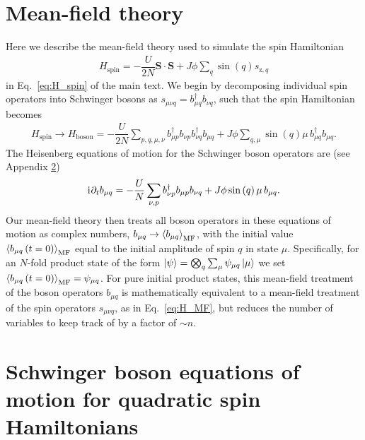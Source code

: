 \documentclass[nofootinbib,twocolumn]{revtex4-2}
\renewcommand{\t}{\text} %
\newcommand{\f}[2]{\dfrac{#1}{#2}} %
\newcommand{\p}[1]{\left(#1\right)} %
\newcommand{\bk}{\Braket} %
\renewcommand{\v}{\bm} %
\renewcommand{\c}{\cdot} %
\renewcommand{\i}{\mathrm{i}\mkern1mu} %
\newcommand{\1}{\mathds{1}}
\newcommand{\z}{\text{z}}
\newcommand{\spin}{\text{spin}}
\newcommand{\MF}{\text{MF}}
\begin{document}
\section{Mean-field theory}
\label{sec:MFT}

Here we describe the mean-field theory used to simulate the spin Hamiltonian
\begin{align}
  H_\spin = -\f{U}{2N}\v S\c\v S + J\phi \sum_q \sin\p{q} s_{\z,q}
\end{align}
in Eq.~\eqref{eq:H_spin} of the main text.
We begin by decomposing individual spin operators into Schwinger bosons as $s_{\mu\nu q} = b_{\mu q}^\dag b_{\nu q}$, such that the spin Hamiltonian becomes
\begin{align}
  H_\spin \to H_{\t{boson}}
  = -\f{U}{2N} \sum_{p,q,\mu,\nu}
  b_{\mu p}^\dag b_{\nu p} b_{\nu q}^\dag b_{\mu q}
  + J\phi \sum_{q,\mu} \sin\p{q} \mu\, b_{\mu q}^\dag b_{\mu q}.
\end{align}
The Heisenberg equations of motion for the Schwinger boson operators are (see Appendix \ref{sec:bosons})
\begin{align}
  \i \partial_t b_{\mu q}
  = -\f{U}{N} \sum_{\nu,p} b_{\nu p}^\dag b_{\mu p} b_{\nu q}
  + J\phi \sin\p{q} \mu\, b_{\mu q}.
\end{align}
Our mean-field theory then treats all boson operators in these equations of motion as complex numbers, $b_{\mu q}\to\bk{b_{\mu q}}_\MF$, with the initial value $\bk{b_{\mu q}\p{t=0}}_\MF$ equal to the initial amplitude of spin $q$ in state $\mu$.
Specifically, for an $N$-fold product state of the form $\ket\psi=\bigotimes_q\sum_\mu\psi_{\mu q}\ket{\mu}$ we set $\bk{b_{\mu q}\p{t=0}}_\MF = \psi_{\mu q}$.
For pure initial product states, this mean-field treatment of the boson operators $b_{\mu q}$ is mathematically equivalent to a mean-field treatment of the spin operators $s_{\mu\nu q}$, as in Eq.~\eqref{eq:H_MF}, but reduces the number of variables to keep track of by a factor of $\sim n$.

\section{Schwinger boson equations of motion for quadratic spin Hamiltonians}
\label{sec:bosons}
\end{document}

